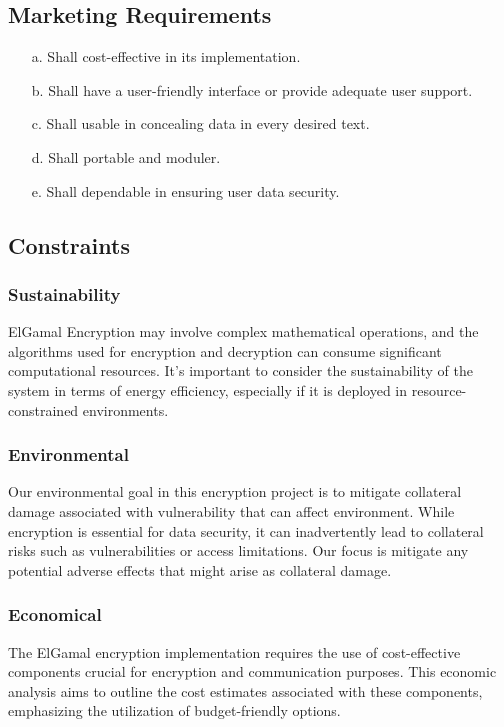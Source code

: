 \documentclass[12pt]{article}
\begin{document}
	\subsection{Marketing Requirements}
	\begin{enumerate}
		\item[a.] Shall  cost-effective in its implementation.
		\item[b.] Shall have a user-friendly interface or provide adequate user support.
		\item[c.] Shall  usable in concealing data in every desired text.
		\item[d.] Shall  portable and moduler.
		\item[e.] Shall  dependable in ensuring user data security.				
	\end{enumerate}
	\subsection{Constraints}
	\subsubsection{Sustainability}
	ElGamal Encryption may involve complex mathematical operations, and the algorithms used for encryption and decryption can consume significant computational resources. It's important to consider the sustainability of the system in terms of energy efficiency, especially if it is deployed in resource-constrained environments.
	\subsubsection{Environmental}
	Our environmental goal in this encryption project is to mitigate collateral damage associated with vulnerability that can affect environment. While encryption is essential for data security, it can inadvertently lead to collateral risks such as vulnerabilities or access limitations. Our focus is mitigate any potential adverse effects that might arise as collateral damage.
	\subsubsection{Economical}
	The ElGamal encryption implementation requires the use of cost-effective components crucial for encryption and communication purposes. This economic analysis aims to outline the cost estimates associated with these components, emphasizing the utilization of budget-friendly options.
	
\end{document}
